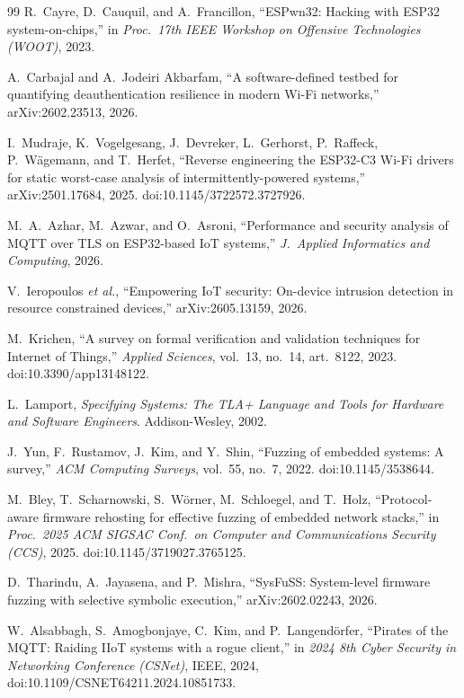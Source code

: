 \begin{thebibliography}{99}
 R.~Cayre, D.~Cauquil, and A.~Francillon, ``ESPwn32: Hacking with ESP32
system-on-chips,'' in \emph{Proc.\ 17th IEEE Workshop on Offensive Technologies (WOOT)}, 2023.

 A.~Carbajal and A.~Jodeiri Akbarfam, ``A software-defined testbed for
quantifying deauthentication resilience in modern Wi-Fi networks,'' arXiv:2602.23513, 2026.

 I.~Mudraje, K.~Vogelgesang, J.~Devreker, L.~Gerhorst, P.~Raffeck,
P.~W\"agemann, and T.~Herfet, ``Reverse engineering the ESP32-C3 Wi-Fi drivers for static
worst-case analysis of intermittently-powered systems,'' arXiv:2501.17684, 2025.
doi:10.1145/3722572.3727926.

 M.~A.~Azhar, M.~Azwar, and O.~Asroni, ``Performance and security analysis
of MQTT over TLS on ESP32-based IoT systems,'' \emph{J.\ Applied Informatics and Computing},
2026.

 V.~Ieropoulos \emph{et al.}, ``Empowering IoT security: On-device
intrusion detection in resource constrained devices,'' arXiv:2605.13159, 2026.

 M.~Krichen, ``A survey on formal verification and validation techniques for
Internet of Things,'' \emph{Applied Sciences}, vol.~13, no.~14, art.~8122, 2023.
doi:10.3390/app13148122.

 L.~Lamport, \emph{Specifying Systems: The TLA+ Language and Tools for
Hardware and Software Engineers}. Addison-Wesley, 2002.

 J.~Yun, F.~Rustamov, J.~Kim, and Y.~Shin, ``Fuzzing of embedded
systems: A survey,'' \emph{ACM Computing Surveys}, vol.~55, no.~7, 2022.
doi:10.1145/3538644.

 M.~Bley, T.~Scharnowski, S.~W\"orner, M.~Schloegel, and T.~Holz,
``Protocol-aware firmware rehosting for effective fuzzing of embedded network stacks,'' in
\emph{Proc.\ 2025 ACM SIGSAC Conf.\ on Computer and Communications Security (CCS)}, 2025.
doi:10.1145/3719027.3765125.

 D.~Tharindu, A.~Jayasena, and P.~Mishra, ``SysFuSS: System-level firmware
fuzzing with selective symbolic execution,'' arXiv:2602.02243, 2026.

 W.~Alsabbagh, S.~Amogbonjaye, C.~Kim, and P.~Langend\"orfer, ``Pirates of
the MQTT: Raiding IIoT systems with a rogue client,'' in \emph{2024 8th Cyber Security in
Networking Conference (CSNet)}, IEEE, 2024, doi:10.1109/CSNET64211.2024.10851733.


\end{thebibliography}

